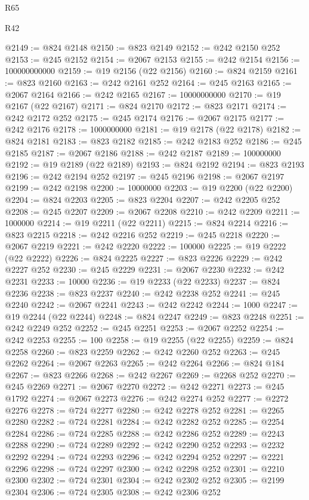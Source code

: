 \begin{lexlean}{R65}
\begin{lexlean}{R42}
\begin{coremodule}
{{{{{{{{{{{{{{{{{{{{{{{{{{{{{{{{{{{{{{{{{{{{{{{{{{{{{{{{{{{{{{{{{{{{{{{{{{{{{{{{{{{{{{{{{{{{{{{{{{{{{{{{{{{{{{{{{{{{{{{{{{{{{{{{{{{{{{{{{{{{{{{{{{{{{{{{{{{{{{{{{{{{{{{{{{{{{{{{{{{{{{{{@2149 := @824 @2148
@2150 := @823 @2149
@2152 := @242 @2150 @252
@2153 := @245 @2152
@2154 := @2067 @2153
@2155 := @242 @2154
@2156 := 100000000000
@2159 := @19 @2156 (@22 @2156)
@2160 := @824 @2159
@2161 := @823 @2160
@2163 := @242 @2161 @252
@2164 := @245 @2163
@2165 := @2067 @2164
@2166 := @242 @2165
@2167 := 10000000000
@2170 := @19 @2167 (@22 @2167)
@2171 := @824 @2170
@2172 := @823 @2171
@2174 := @242 @2172 @252
@2175 := @245 @2174
@2176 := @2067 @2175
@2177 := @242 @2176
@2178 := 1000000000
@2181 := @19 @2178 (@22 @2178)
@2182 := @824 @2181
@2183 := @823 @2182
@2185 := @242 @2183 @252
@2186 := @245 @2185
@2187 := @2067 @2186
@2188 := @242 @2187
@2189 := 100000000
@2192 := @19 @2189 (@22 @2189)
@2193 := @824 @2192
@2194 := @823 @2193
@2196 := @242 @2194 @252
@2197 := @245 @2196
@2198 := @2067 @2197
@2199 := @242 @2198
@2200 := 10000000
@2203 := @19 @2200 (@22 @2200)
@2204 := @824 @2203
@2205 := @823 @2204
@2207 := @242 @2205 @252
@2208 := @245 @2207
@2209 := @2067 @2208
@2210 := @242 @2209
@2211 := 1000000
@2214 := @19 @2211 (@22 @2211)
@2215 := @824 @2214
@2216 := @823 @2215
@2218 := @242 @2216 @252
@2219 := @245 @2218
@2220 := @2067 @2219
@2221 := @242 @2220
@2222 := 100000
@2225 := @19 @2222 (@22 @2222)
@2226 := @824 @2225
@2227 := @823 @2226
@2229 := @242 @2227 @252
@2230 := @245 @2229
@2231 := @2067 @2230
@2232 := @242 @2231
@2233 := 10000
@2236 := @19 @2233 (@22 @2233)
@2237 := @824 @2236
@2238 := @823 @2237
@2240 := @242 @2238 @252
@2241 := @245 @2240
@2242 := @2067 @2241
@2243 := @242 @2242
@2244 := 1000
@2247 := @19 @2244 (@22 @2244)
@2248 := @824 @2247
@2249 := @823 @2248
@2251 := @242 @2249 @252
@2252 := @245 @2251
@2253 := @2067 @2252
@2254 := @242 @2253
@2255 := 100
@2258 := @19 @2255 (@22 @2255)
@2259 := @824 @2258
@2260 := @823 @2259
@2262 := @242 @2260 @252
@2263 := @245 @2262
@2264 := @2067 @2263
@2265 := @242 @2264
@2266 := @824 @184
@2267 := @823 @2266
@2268 := @242 @2267
@2269 := @2268 @252
@2270 := @245 @2269
@2271 := @2067 @2270
@2272 := @242 @2271
@2273 := @245 @1792
@2274 := @2067 @2273
@2276 := @242 @2274 @252
@2277 := @2272 @2276
@2278 := @724 @2277
@2280 := @242 @2278 @252
@2281 := @2265 @2280
@2282 := @724 @2281
@2284 := @242 @2282 @252
@2285 := @2254 @2284
@2286 := @724 @2285
@2288 := @242 @2286 @252
@2289 := @2243 @2288
@2290 := @724 @2289
@2292 := @242 @2290 @252
@2293 := @2232 @2292
@2294 := @724 @2293
@2296 := @242 @2294 @252
@2297 := @2221 @2296
@2298 := @724 @2297
@2300 := @242 @2298 @252
@2301 := @2210 @2300
@2302 := @724 @2301
@2304 := @242 @2302 @252
@2305 := @2199 @2304
@2306 := @724 @2305
@2308 := @242 @2306 @252
}}}}}}}}}}}}}}}}}}}}}}}}}}}}}}}}}}}}}}}}}}}}}}}}}}}}}}}}}}}}}}}}}}}}}}}}}}}}}}}}}}}}}}}}}}}}}}}}}}}}}}}}}}}}}}}}}}}}}}}}}}}}}}}}}}}}}}}}}}}}}}}}}}}}}}}}}}}}}}}}}}}}}}}}}}}}}}}}}}}}}}}}
\end{coremodule}
\end{lexlean}
\end{lexlean}
